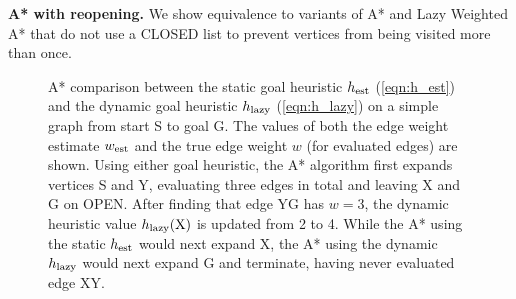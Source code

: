 \documentclass[nobib]{tufte-book}
\newcommand{\ms}[1]{\mbox{\scriptsize #1}}
\newcommand{\ssnote}[1]{{\xxnote{SS}{red}{#1}}}
\newcommand{\xxnote}[3]{}
\renewcommand{\xxnote}[3]{\color{#2}{#1: #3}}
\begin{document}
\textbf{A* with reopening.}
We show equivalence to variants of A* and Lazy Weighted A*
that do not use a CLOSED list to prevent
vertices from being visited more than once.

\begin{figure}
   \centering
   \caption{A* comparison between
      the static goal heuristic $h_{\ms{est}}$ (\ref{eqn:h_est})
      and the dynamic goal heuristic $h_{\ms{lazy}}$ (\ref{eqn:h_lazy})
      on a simple graph from start S to goal G.
      The values of both the edge weight estimate $w_{\ms{est}}$
      and the true edge weight $w$ (for evaluated edges) are shown.
      Using either goal heuristic,
      the A* algorithm first expands vertices S and Y,
      evaluating three edges in total and leaving X and G on OPEN.
      After finding that edge YG has $w=3$,
      the dynamic heuristic value $h_{\ms{lazy}}(\mbox{X})$
      is updated from 2 to 4.
      While the A* using the static $h_{\ms{est}}$ would next expand X,
      the A* using the dynamic $h_{\ms{lazy}}$ would next expand G
      and terminate, having never evaluated edge XY.}
   \label{fig:updating-heuristic}
\end{figure}
\end{document}
